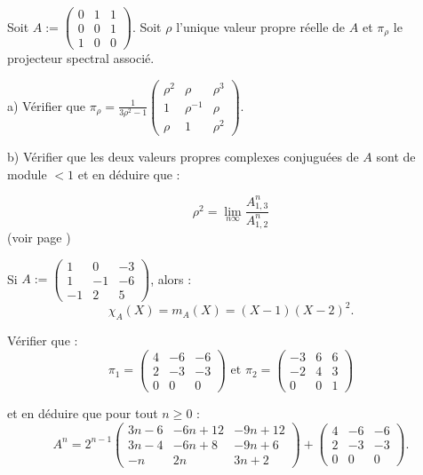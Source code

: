 \documentclass[class=report,crop=false]{standalone}
\begin{document}
\begin{exercicecours}
Soit $A:= \left( \begin{array}{ccc}
0&1&1\\
0 &0&1\\
1 &0 &0
\end{array}
\right)$. Soit $\rho$ l'unique valeur propre réelle de $A$ et $\pi_\rho$ le projecteur spectral associé.

a) Vérifier que $\pi_\rho = \frac{1}{3\rho^2-1}\left( \begin{array}{ccc}
\rho^2&\rho&\rho^3\\
1 &\rho^{-1}&\rho\\
\rho &1 &\rho^2
\end{array}
\right)$.

b) Vérifier que les deux valeurs propres complexes conjuguées de $A$ sont de module $< 1$ et en déduire que :

\[\rho^2 =\lim_{n \infty}\frac{A^n_{1,3}}{A^n_{1,2}}\]
(voir page \pageref{exdupilote})

\begin{exercicecours}
Si $A:= \left(\begin{array}{ccc}
1 & 0 & -3\\
1&-1&-6\\
-1&2&5
\end{array}\right)$, alors :
\[\chi_A(X) = m_A(X)= (X-1)(X-2)^2.\]

Vérifier que :
\[\pi_1 =\left(\begin{array}{ccc}
4 & -6& -6\\
2&-3&-3\\
0&0&0
\end{array}\right) \text{ et } \pi_2 = \left(\begin{array}{ccc}
-3& 6 & 6\\
-2&4&3\\
0&0&1\end{array}\right)\]

et en déduire que pour tout $n \ge 0$ :
\[A^n = 2^{n-1}\left(\begin{array}{ccc}
3n-6 & -6n+12 & -9n+12\\
3n-4&-6n+8&-9n+6\\
-n&2n&3n+2
\end{array}\right)+ \left(\begin{array}{ccc}
4 & -6& -6\\
2&-3&-3\\
0&0&0
\end{array}\right).
\]
\end{exercicecours}

\end{exercicecours}
\end{document}
